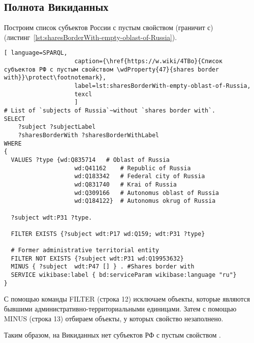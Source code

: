 \newpage
\subsection{Полнота Викиданных}

Построим список субъектов России с пустым свойством  (граничит с) (листинг~\protect\ref{lst:sharesBorderWith-empty-oblast-of-Russia}).

\lstset{numbers=left, firstnumber=1, frame=single}
\begin{lstlisting}[ language=SPARQL, 
                    caption={\href{https://w.wiki/4TBo}{Список субъектов РФ с пустым свойством \wdProperty{47}{shares border with}}\protect\footnotemark},
                    label=lst:sharesBorderWith-empty-oblast-of-Russia,
                    texcl 
                    ]
# List of `subjects of Russia`~without `shares border with`. 
SELECT 
    ?subject ?subjectLabel 
    ?sharesBorderWith ?sharesBorderWithLabel
WHERE
{
  VALUES ?type {wd:Q835714   # Oblast of Russia
                    wd:Q41162    # Republic of Russia
                    wd:Q183342   # Federal city of Russia
                    wd:Q831740   # Krai of Russia
                    wd:Q309166   # Autonomus oblast of Russia
                    wd:Q184122}  # Autonomus okrug of Russia
  
  ?subject wdt:P31 ?type.
  
  FILTER EXISTS {?subject wdt:P17 wd:Q159; wdt:P31 ?type}
  
  # Former administrative territorial entity
  FILTER NOT EXISTS {?subject wdt:P31 wd:Q19953632} 
  MINUS { ?subject  wdt:P47 [] } . #Shares border with 
  SERVICE wikibase:label { bd:serviceParam wikibase:language "ru"}
}
\end{lstlisting}%

С помощью команды FILTER (строка 12) исключаем объекты, которые являются бывшими административно-территориальными единицами. Затем с помощью MINUS (строка 13) отбираем объекты, у которых свойство  незаполнено.

Таким образом, на Викиданных нет субъектов РФ с пустым свойством .

